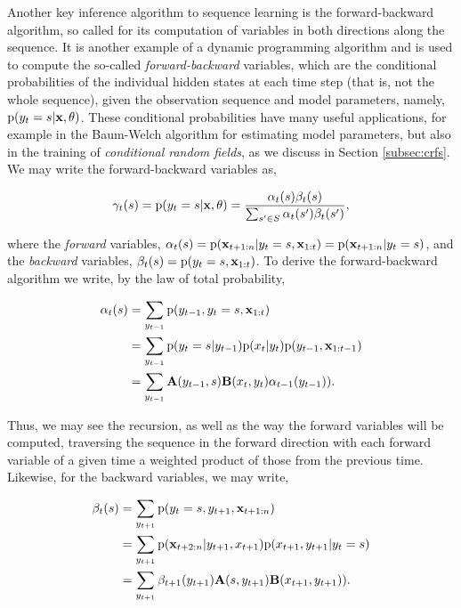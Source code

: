 Another key inference algorithm to sequence learning is the forward-backward algorithm, so called for its computation of variables in both directions along the sequence. It is another example of a dynamic programming algorithm and is used to compute the so-called \emph{forward-backward} variables, which are the conditional probabilities of the individual hidden states at each time step (that is, not the whole sequence), given the observation sequence and model parameters, namely, $\text{p}(y_t = s | \mathbf{x}, \theta)$. These conditional probabilities have many useful applications, for example in the Baum-Welch algorithm for estimating model parameters, but also in the training of \emph{conditional random fields}, as we discuss in Section \ref{subsec:crfs}. We may write the forward-backward variables as,

\begin{equation}
\gamma_t(s) = \text{p}(y_t = s | \mathbf{x}, \theta) = \frac{\alpha_t(s) \beta_t(s)}{\sum_{s' \in S} \alpha_t(s') \beta_t(s')},
\label{eq:fb}
\end{equation}

where the \emph{forward} variables, $\alpha_t(s) = \text{p}(\mathbf{x}_{t+1:n}|y_t = s, \mathbf{x}_{1:t}) = \text{p}(\mathbf{x}_{t+1:n}|y_t = s)$, and the \emph{backward} variables, $\beta_t(s) = \text{p}(y_t = s, \mathbf{x}_{1:t})$. To derive the forward-backward algorithm we write, by the law of total probability,

\begin{equation}
\begin{aligned}
\alpha_t(s) &= \sum_{y_{t-1}} \text{p}(y_{t-1}, y_t = s, \mathbf{x}_{1:t}) \\
& = \sum_{y_{t-1}} \text{p}(y_t = s|y_{t-1}) \text{p}(x_t|y_t) \text{p}(y_{t-1}, \mathbf{x}_{1:t-1}) \\
& = \sum_{y_{t-1}} \mathbf{A}(y_{t-1}, s) \mathbf{B}(x_t, y_t) \alpha_{t-1}(y_{t-1})).
\end{aligned}
\label{eq:forward}
\end{equation}

Thus, we may see the recursion, as well as the way the forward variables will be computed, traversing the sequence in the forward direction with each forward variable of a given time a weighted product of those from the previous time. Likewise, for the backward variables, we may write,

\begin{equation}
\begin{aligned}
\beta_t(s) &= \sum_{y_{t+1}} \text{p}(y_t = s, y_{t+1}, \mathbf{x}_{t+1:n}) \\
& = \sum_{y_{t+1}} \text{p}(\mathbf{x}_{t+2:n}|y_{t+1}, x_{t+1}) \text{p}(x_{t+1}, y_{t+1}|y_t = s) \\
& = \sum_{y_{t+1}} \beta_{t+1}(y_{t+1}) \mathbf{A}(s, y_{t+1}) \mathbf{B}(x_{t+1}, y_{t+1})).
\end{aligned}
\label{eq:backward}
\end{equation}

